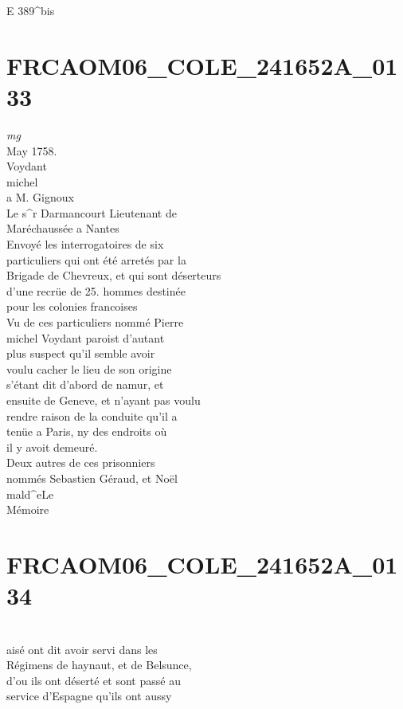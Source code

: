 \documentclass{article}
\begin{document}
\begin{pages}
E 389\^{}bis
\pend
\endnumbering\beginnumbering\section{FRCAOM06\_COLE\_241652A\_0133}
\vspace{0.5cm}\noindent
\textit{mg}
\footnotesize \\
May 1758.\\
Voydant\\
michel\\
a M. Gignoux
\normalsize \pstart
\\
Le s\^{}r Darmancourt Lieutenant de\\
Maréchaussée a Nantes\\
Envoyé les interrogatoires de six\\
particuliers qui ont été arretés par la\\
Brigade de Chevreux, et qui sont déserteurs\\
d'une recrüe de 25. hommes destinée\\
pour les colonies francoises\\
Vu de ces particuliers nommé Pierre\\
michel Voydant paroist d'autant\\
plus suspect qu'il semble avoir\\
voulu cacher le lieu de son origine\\
s'étant dit d'abord de namur, et\\
ensuite de Geneve, et n'ayant pas voulu\\
rendre raison de la conduite qu'il a\\
tenüe a Paris, ny des endroits où\\
il y avoit demeuré.\\
Deux autres de ces prisonniers\\
nommés Sebastien Géraud, et Noël
\pend\pstart
\\
mald\^{}eLe\\
Mémoire
\pend
\endnumbering\beginnumbering\section{FRCAOM06\_COLE\_241652A\_0134}\pstart
\\
aisé ont dit avoir servi dans les\\
Régimens de haynaut, et de Belsunce,\\
d'ou ils ont déserté et sont passé au\\
service d'Espagne qu'ils ont aussy\\

\end{pages}
\end{document}
